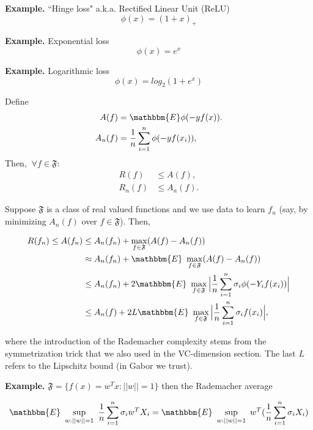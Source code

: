 \documentclass[11pt, english]{article}
\begin{document}
\textbf{Example.} ``Hinge loss" a.k.a. Rectified Linear Unit (ReLU)\\
\begin{equation} %
\phi(x) = (1+x)_+
\end{equation}

\textbf{Example.} Exponential loss\\
\begin{equation} %
\phi(x) = e^x
\end{equation}

\textbf{Example.} Logarithmic loss\\
\begin{equation} %
\phi(x) = log_2(1+e^x)
\end{equation}

 
Define 
\begin{align} %
A(f) &= \mathbbm{E}\phi(-yf(x)).\\
A_n(f) &= \frac{1}{n}\sum_{i=1}^n \phi(-yf(x_i)),
\end{align}
Then, $\ \forall f \in \mathfrak{F}$:%
\begin{align}
R(f) &\leq A(f),\\
R_n(f) &\leq A_n(f).
\end{align}
 
Suppose $\mathfrak{F}$ is a class of real valued functions and we use data to learn $f_n$ (say, by minimizing $A_n(f)$ over $f \in \mathfrak{F}$). Then,
 
\begin{align}
	 R(f_n)\leq A(f_n) &\leq A_n(f_n) + \max_{f \in \mathfrak{F}}(A(f) - A_n(f))\\
	 & \approx A_n(f_n) + \mathbbm{E}\ \max_{f \in \mathfrak{F}}(A(f) - A_n(f))\\
	 & \leq A_n(f_n) + 2 \mathbbm{E}\ \max_{f \in \mathfrak{F}} \Big|\frac{1}{n} \sum_{i=1}^{n}\sigma_i \phi(-Y_i f(x_i))\Big|\\ 
	 & \leq A_n(f) + 2L \mathbbm{E}\ \max_{f \in \mathfrak{F}} \Big|\frac{1}{n} \sum_{i=1}^{n}\sigma_i f(x_i)\Big|,
\end{align} %

where the introduction of the Rademacher complexity stems from the symmetrization trick that we also used in the VC-dimension section. The last $L$ refers to the Lipschitz bound (in Gabor we trust).%
 
\textbf{Example.} $\mathfrak{F} = \{f(x) = w^Tx : ||w|| = 1\}$ then the Rademacher average
 
\begin{equation}
\mathbbm{E}\ \sup\limits_{w:||w||=1} \ \frac{1}{n} \sum_{i=1}^n \sigma_i w^T X_i = \mathbbm{E}\ \sup\limits_{w:||w||=1} \ w^T(\frac{1}{n} \sum_{i=1}^{n} \sigma_i X_i)%
\end{equation}
 
\end{document}
